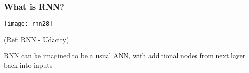 \begin{frame}[fragile] \frametitle{What is RNN?}

\begin{center}
\texttt{[image: rnn28]}

\tiny{(Ref: RNN - Udacity)}

\end{center}

RNN can be imagined to be a usual ANN, with additional nodes from next layer back into inputs.
\end{frame}










